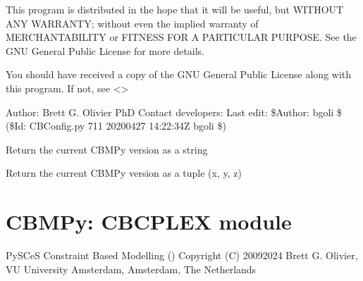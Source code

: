 \documentclass[letterpaper,10pt,english]{sphinxmanual}
\begin{document}
\sphinxAtStartPar
This program is distributed in the hope that it will be useful,
but WITHOUT ANY WARRANTY; without even the implied warranty of
MERCHANTABILITY or FITNESS FOR A PARTICULAR PURPOSE.  See the
GNU General Public License for more details.

\sphinxAtStartPar
You should have received a copy of the GNU General Public License
along with this program.  If not, see \textless{}\textgreater{}

\sphinxAtStartPar
Author: Brett G. Olivier PhD
Contact developers: 
Last edit: \$Author: bgoli \$ (\$Id: CBConfig.py 711 2020\sphinxhyphen{}04\sphinxhyphen{}27 14:22:34Z bgoli \$)

\begin{fulllineitems}
\label{\detokenize{modules_doc:cbmpy.CBConfig.current_version}}
\pysigstartsignatures
{}
\pysigstopsignatures
\sphinxAtStartPar
Return the current CBMPy version as a string

\end{fulllineitems}


\begin{fulllineitems}
\label{\detokenize{modules_doc:cbmpy.CBConfig.current_version_tuple}}
\pysigstartsignatures
{}
\pysigstopsignatures
\sphinxAtStartPar
Return the current CBMPy version as a tuple (x, y, z)

\end{fulllineitems}

\label{\detokenize{modules_doc:module-cbmpy.CBCPLEX}}

\section{CBMPy: CBCPLEX module}
\label{\detokenize{modules_doc:cbmpy-cbcplex-module}}
\sphinxAtStartPar
PySCeS Constraint Based Modelling ()
Copyright (C) 2009\sphinxhyphen{}2024 Brett G. Olivier, VU University Amsterdam, Amsterdam, The Netherlands
\end{document}
